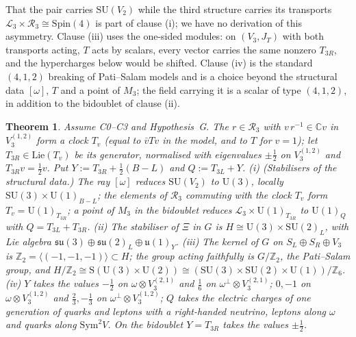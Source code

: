 \documentclass[aps,pra,onecolumn,superscriptaddress,nofootinbib,10pt]{revtex4-2}
\newtheorem{theorem}{Theorem}
\theoremstyle{definition}
\theoremstyle{remark}
\newcommand{\C}{\mathbb{C}}
\newcommand{\Z}{\mathbb{Z}}
\newcommand{\su}{\mathfrak{su}}
\newcommand{\cL}{\mathcal{L}}
\newcommand{\cR}{\mathcal{R}}
\newcommand{\SU}{\mathrm{SU}}
\newcommand{\U}{\mathrm{U}}
\begin{document}
\smallskip
That the pair carries $\SU(V_2)$ while the third structure carries its transports
$\cL_3\times\cR_3\cong\mathrm{Spin}(4)$ is part of clause (i); we have no derivation of this asymmetry.
Clause (iii) uses the one-sided modules: on $(V_3,J_T)$ with both transports acting, $T$ acts by
scalars, every vector carries the same nonzero $T_{3R}$, and the hypercharges below would be shifted.
Clause (iv) is the standard $(4,1,2)$ breaking of Pati--Salam models and is a choice beyond the
structural data $[\omega]$, $T$ and a point of $M_3$; the field carrying it is a scalar of type
$(4,1,2)$, in addition to the bidoublet of clause (ii).

\begin{theorem}\label{thm:sm}
Assume C0--C3 and Hypothesis~G.  The $r\in\cR_3$ with
$v\,r^{-1}\in\C v$ in $V_3^{(1,2)}$ form a clock $T_v$ (equal to $\bar vTv$ in the model, and to $T$ for
$v=1$); let $T_{3R}\in\mathrm{Lie}(T_v)$ be its generator, normalised with eigenvalues $\pm\frac12$ on
$V_3^{(1,2)}$ and $T_{3R}v=\frac12v$.  Put $Y:=T_{3R}+\tfrac12(B-L)$ and $Q:=T_{3L}+Y$.
(i) (Stabilisers of the structural data.)  The ray $[\omega]$ reduces $\SU(V_2)$ to $\U(3)$, locally
$\SU(3)\times\U(1)_{B-L}$; the elements of $\cR_3$ commuting with the clock $T_v$ form $T_v=\U(1)_{T_{3R}}$; a point of $M_3$ in the bidoublet
reduces $\cL_3\times\U(1)_{T_{3R}}$ to $\U(1)_Q$ with $Q=T_{3L}+T_{3R}$.
(ii) The stabiliser of $\Xi$ in $G$ is $H\cong\U(3)\times\SU(2)_L$, with Lie algebra
$\su(3)\oplus\su(2)_L\oplus\mathfrak u(1)_Y$.
(iii) The kernel of $G$ on $S_L\oplus S_R\oplus V_3$ is $\Z_2=\langle(-1,-1,-1)\rangle\subset H$; the group
acting faithfully is $G/\Z_2$, the Pati--Salam group, and $H/\Z_2\cong\mathrm S(\U(3)\times\U(2))\cong
(\SU(3)\times\SU(2)\times\U(1))/\Z_6$.
(iv) $Y$ takes the values $-\tfrac12$ on $\omega\otimes V_3^{(2,1)}$ and $\tfrac16$ on $\omega^\perp\otimes V_3^{(2,1)}$;
$0,-1$ on $\omega\otimes V_3^{(1,2)}$ and $\tfrac23,-\tfrac13$ on $\omega^\perp\otimes V_3^{(1,2)}$; $Q$ takes the
electric charges of one generation of quarks and leptons with a right-handed neutrino, leptons along
$\omega$ and quarks along $\mathrm{Sym}^2V$.  On the bidoublet $Y=T_{3R}$ takes the values $\pm\frac12$.
\end{theorem}
\end{document}
